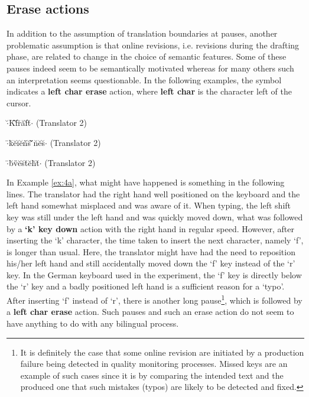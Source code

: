 \subsection{Erase actions}
\label{sec:EraseActions}

In addition to the assumption of translation boundaries at pauses, another problematic assumption is that online revisions, i.e. revisions during the drafting phase, are related to change in the choice of semantic features. Some of these pauses indeed seem to be semantically motivated whereas for many others such an interpretation seems questionable. In the following examples, the symbol \uettl{ } indicates a \textbf{left char erase} action, where \textbf{left char} is the character left of the cursor.


\begin{exe}
  \ex\label{ex:4a}$\cdot$\u{ }K\={ }f\=\uettl\u{ }r\u{ }a\u{ }f\u{ }t\u{ }$\cdot$ (Translator 2)
\end{exe}

\begin{exe} 
  \ex\label{ex:4b}$\cdot$\={ }k\u{ }e\u{ }i\u{ }e\u{ }n\={ }\uettl\u{ }s\u{ } \={ }\uettl\u{ }\uettl\u{ }\uettl\={ }n\u{ }e\u{ }s\u{ }$\cdot$ (Translator 2)
\end{exe}


\begin{exe} 
  \ex\label{ex:4c}$\cdot$\={ }b\u{ }v\={ }\uettl\={ }e\u{ }s\u{ }t\u{ }e\u{ }h\u{ }t\u{ }$\cdot$ (Translator 2)
\end{exe}

In Example \ref{ex:4a}, what might have happened is something in the following lines. The translator had the right hand well positioned on the keyboard and the left hand somewhat misplaced and was aware of it. When typing, the left shift key was still under the left hand and was quickly moved down, what was followed by a \textbf{`k' key down} action with the right hand in regular speed. However, after inserting the `k' character, the time taken to insert the next character, namely `f', is longer than usual. Here, the translator might have had the need to reposition his/her left hand and still accidentally moved down the `f' key instead of the `r' key. In the German keyboard used in the experiment, the `f' key is directly below the `r' key and a badly positioned left hand is a sufficient reason for a `typo'.  After inserting `f' instead of `r', there is another long pause\footnote{It is definitely the case that some online revision are initiated by a production failure being detected in quality monitoring processes. Missed keys are an example of such cases since it is by comparing the intended text and the produced one that such mistakes (typos) are likely to be detected and fixed.}, which is followed by a \textbf{left char erase} action. Such pauses and such an erase action do not seem to have anything to do with any bilingual process.

